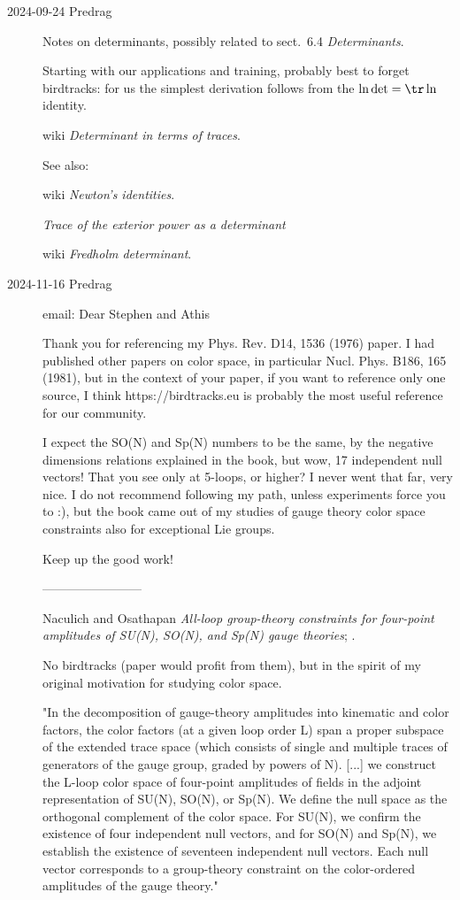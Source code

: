 \begin{description}
\item[2024-09-24 Predrag] Notes on determinants, possibly related to
 {sect.~6.4} {\em Determinants}.

Starting with our applications and training, probably best to forget birdtracks:
for us the simplest derivation follows from the
$\ln \det = \tr \ln$ identity.

 {wiki {\em Determinant in terms of traces}}.

See also:

 {wiki {\em Newton's identities}}.

{{\em Trace of the exterior power as a determinant}}

 {wiki {\em Fredholm determinant}}.

\item[2024-11-16 Predrag] email:
Dear Stephen and Athis

Thank you for referencing my Phys. Rev. D14, 1536 (1976) paper. I had
published other papers on color space, in particular Nucl. Phys. B186,
165 (1981),  but in the context of your paper, if you want to reference
only one source, I think https://birdtracks.eu is probably the most
useful reference for our community.

I expect the SO(N) and Sp(N) numbers to be the same, by the negative
dimensions relations explained in the book, but wow, 17 independent null
vectors! That you see only at 5-loops, or higher?
I never went that far, very nice. I do not recommend following
my path, unless experiments force you to :), but the book came out of my
studies of gauge theory color space constraints also for exceptional Lie
groups.

Keep up the good work!

------------------------

Naculich and Osathapan {\em All-loop group-theory
constraints for four-point amplitudes of {SU(N), SO(N), and Sp(N)} gauge
theories}; %
.

No birdtracks (paper would profit from them), but in the spirit of my
original motivation for studying color space.

"In the decomposition of gauge-theory amplitudes into kinematic and color
factors, the color factors (at a given loop order L) span a proper
subspace of the extended trace space (which consists of single and
multiple traces of generators of the gauge group, graded by powers of N).
[...] we construct the L-loop color space of four-point amplitudes of
fields in the adjoint representation of SU(N), SO(N), or Sp(N). We define
the null space as the orthogonal complement of the color space. For
SU(N), we confirm the existence of four independent null vectors, and for
SO(N) and Sp(N), we establish the existence of seventeen independent null
vectors. Each null vector corresponds to a group-theory constraint on the
color-ordered amplitudes of the gauge theory."



\end{description}

